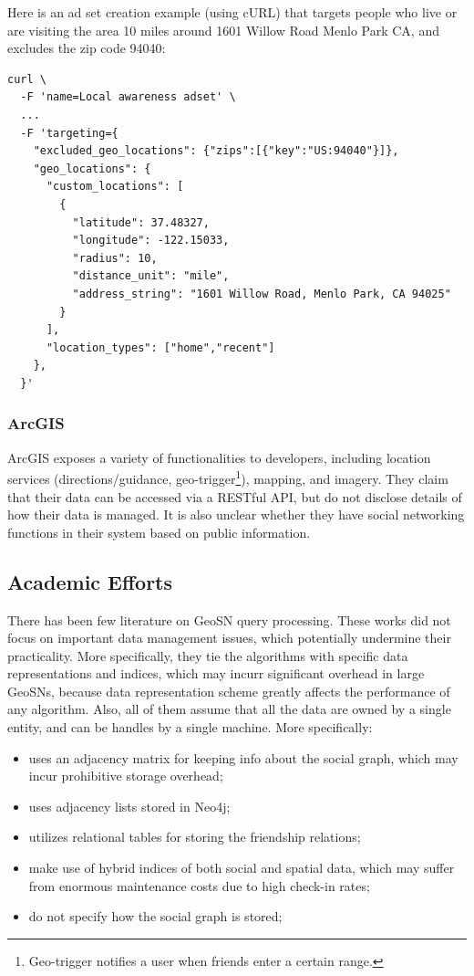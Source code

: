 Here is an ad set creation example (using cURL) that targets people who live or are visiting the area 10 miles around 1601 Willow Road Menlo Park CA, and excludes the zip code 94040:

\begin{verbatim}
curl \
  -F 'name=Local awareness adset' \
  ...
  -F 'targeting={ 
    "excluded_geo_locations": {"zips":[{"key":"US:94040"}]}, 
    "geo_locations": { 
      "custom_locations": [ 
        { 
          "latitude": 37.48327, 
          "longitude": -122.15033, 
          "radius": 10, 
          "distance_unit": "mile", 
          "address_string": "1601 Willow Road, Menlo Park, CA 94025" 
        } 
      ], 
      "location_types": ["home","recent"] 
    }, 
  }' 
\end{verbatim}

\subsubsection{ArcGIS}
ArcGIS\cite{arcgis} exposes a variety of functionalities to developers, including location services (directions/guidance, geo-trigger\footnote{Geo-trigger notifies a user when friends enter a certain range.}), mapping, and imagery. They claim that their data can be accessed via a RESTful API, but do not disclose details of how their data is managed. It is also unclear whether they have social networking functions in their system based on public information.

\subsection{Academic Efforts}
There has been few literature on GeoSN query processing\cite{amir2007buddy,yiu2010efficient,khoshgozaran2009private,scellato2010distance}. These works did not focus on important data management issues, which potentially undermine their practicality. More specifically, they tie the algorithms with specific data representations and indices, which may incurr significant overhead in large GeoSNs, because data representation scheme greatly affects the performance of any algorithm. Also, all of them assume that all the data are owned by a single entity, and can be handles by a single machine. More specifically:
\begin{itemize}
	\item\cite{khoshgozaran2009private,Liu} uses an adjacency matrix for keeping info about the social graph, which may incur prohibitive storage overhead;
	\item \cite{doytsher2012managing} uses adjacency lists stored in Neo4j\cite{developers2012neo4j};
	\item \cite{doytsher2010querying} utilizes relational tables for storing the friendship relations;
	\item\cite{amir2007buddy,scellato2010distance} make use of hybrid indices of both social and spatial data, which may suffer from enormous maintenance costs due to high check-in rates;
	\item\cite{yiu2010efficient,scellato2010distance} do not specify how the social graph is stored;
\end{itemize}

